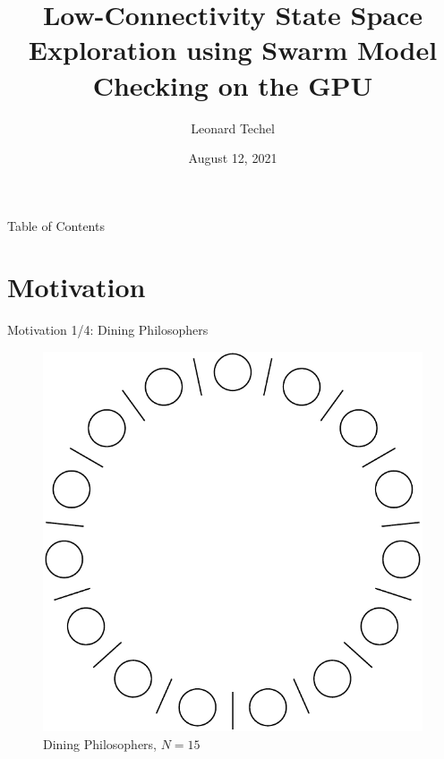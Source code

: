 \documentclass[aspectratio=169]{beamer}
\author{Leonard Techel}
\title{Low-Connectivity State Space Exploration using Swarm Model Checking on the GPU}
\date{August 12, 2021}
\begin{document}
\maketitle

\begin{frame}{Table of Contents}
    \tableofcontents
\end{frame}

\section{Motivation}

\begin{frame}{Motivation 1/4: Dining Philosophers}
    \vspace{.5cm}
    \begin{figure}
        \includegraphics[width=.35\textwidth]{../figures/dining-philosophers}
        \caption{Dining Philosophers, $N=15$}
        \label{fig:dining-philosophers}
    \end{figure}
\end{frame}
\end{document}
